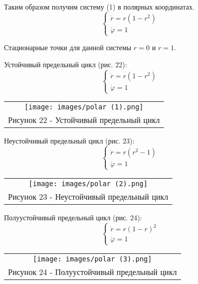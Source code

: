 Таким образом получим систему (1) в полярных координатах.
\begin{equation}
  \begin{cases}
    \dot{r}=r(1-r^2)\\
    \dot{\varphi}=1
  \end{cases}
\end{equation}

Стационарные точки для данной системы $r=0$ и $r=1$.

Устойчивый предельный цикл (рис. 22):
\begin{equation}
  \begin{cases}
    \dot{r}=r(1-r^2)\\
    \dot{\varphi}=1
  \end{cases}
\end{equation}

\begin{center}
  \begin{tabular}{c}
    \texttt{[image: images/polar (1).png]}\\
    Рисунок 22 - Устойчивый предельный цикл
  \end{tabular}
\end{center}

Неустойчивый предельный цикл (рис. 23):
\begin{equation}
  \begin{cases}
    \dot{r}=r(r^2-1)\\
    \dot{\varphi}=1
  \end{cases}
\end{equation}

\begin{center}
  \begin{tabular}{c}
    \texttt{[image: images/polar (2).png]}\\
    Рисунок 23 - Неустойчивый предельный цикл
  \end{tabular}
\end{center}

Полуустойчивый предельный цикл (рис. 24):
\begin{equation}
  \begin{cases}
    \dot{r}=r(1-r)^2\\
    \dot{\varphi}=1
  \end{cases}
\end{equation}

\begin{center}
  \begin{tabular}{c}
    \texttt{[image: images/polar (3).png]}\\
    Рисунок 24 - Полуустойчивый предельный цикл
  \end{tabular}
\end{center}

